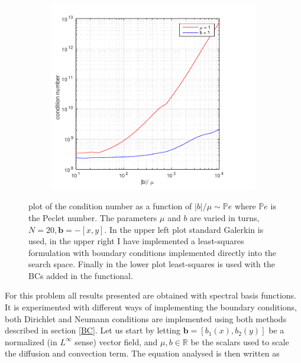 \begin{figure}[b]
\begin{subfigure}[b]{0.48\textwidth}
  \end{subfigure}
  \begin{subfigure}[b]{0.48\textwidth}
		\includegraphics[width=\textwidth]{Figures/Spec-LS_difftrans_ConditionNumber_DirFunc.pdf}
  \end{subfigure}
  \vspace{-0.1\baselineskip}
	\caption{plot of the condition number as a function of $|b|/\mu \sim \mathbb{P}e$ where $\mathbb{P}e$ is the Peclet number. The parameters $\mu$ and $b$ are varied in turns, $N=20,\mathbf{b} = -[x,y]$. In the upper left plot standard Galerkin is used, in the upper right I have implemented a least-squares formulation with boundary conditions implemented directly into the search space. Finally in the lower plot least-squares is used with the BCs added in the functional.}
  \label{fig:CondDifftransSpec}
\end{figure}
%
For this problem all results presented are obtained with spectral basis functions. It is experimented with different ways of implementing the boundary conditions, both Dirichlet and Neumann conditions are implemented using both methods described in section \ref{BC}.
Let us start by letting $\mathbf{b} = [b_1(x),b_2(y)] $ be a normalized (in $L^{\infty}$ sense) vector field, and $\mu,b \in \mathbb{R}$ be the scalars used to scale the diffusion and convection term. The equation analysed is then written as 
